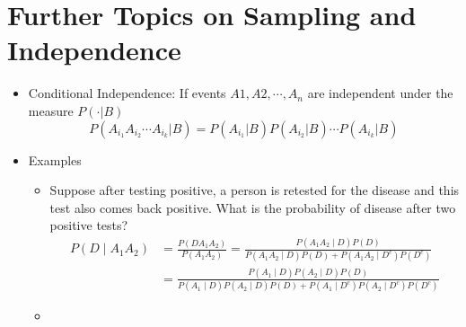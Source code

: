 \documentclass{report}
\begin{document}
\section{Further Topics on Sampling and Independence}
  \begin{itemize}
    \item Conditional Independence: If events $A1,A2, \cdots , A_n$ are independent under the measure $P( \cdot | B)$
      \[ P(A_i_1 A_i_2 \cdots A_i_k | B) = P(A_i_1 | B) P(A_i_2 | B) \cdots P(A_i_k | B) \]
    \item Examples
      \begin{itemize}
        \item Suppose after testing positive, a person is retested for the disease
and this test also comes back positive. What is the probability of disease after two
positive tests?
        \[ \begin{aligned}
            P\left(D \mid A_1 A_2\right)
            & =\frac{P\left(D A_1 A_2\right)}{P\left(A_1 A_2\right)}
              =\frac{P\left(A_1 A_2 \mid D\right) P(D)}{P\left(A_1 A_2 \mid D\right)
                P(D)+P\left(A_1 A_2 \mid D^c\right) P\left(D^c\right)} \\
            & =\frac{P\left(A_1 \mid D\right) P\left(A_2 \mid D\right)
                P(D)}{P\left(A_1 \mid D\right) P\left(A_2 \mid D\right)
                P(D)+P\left(A_1 \mid D^c\right) P\left(A_2 \mid D^c\right) P\left(D^c\right)}
           \end{aligned} \]
        \item 
      \end{itemize}
  \end{itemize}
\end{document}
